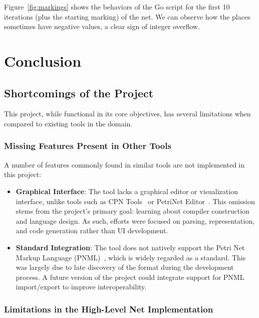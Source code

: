\documentclass[12pt]{article}
\begin{document}
            Figure~\ref{fig:markings} shows the behaviors of the Go script for the first 10 iterations (plus the starting marking) of the net. We can observe how the places sometimes have negative values, a clear sign of integer overflow.


\section{Conclusion}
    \subsection*{Shortcomings of the Project}

    This project, while functional in its core objectives, has several limitations when compared to existing tools in the domain.

    \subsubsection*{Missing Features Present in Other Tools}

        A number of features commonly found in similar tools are not implemented in this project:
        \begin{itemize}
            \item \textbf{Graphical Interface}: The tool lacks a graphical editor or visualization interface, unlike tools such as CPN Tools~\cite{verbeek2021cpn} or PetriNet Editor~\cite{app10217662}. This omission stems from the project's primary goal: learning about compiler construction and language design. As such, efforts were focused on parsing, representation, and code generation rather than UI development.
            \item \textbf{Standard Integration}: The tool does not natively support the Petri Net Markup Language (PNML)~\cite{weber2003petri}, which is widely regarded as a standard. This was largely due to late discovery of the format during the development process. A future version of the project could integrate support for PNML import/export to improve interoperability.
        \end{itemize}

    \subsubsection*{Limitations in the High-Level Net Implementation}
\end{document}
